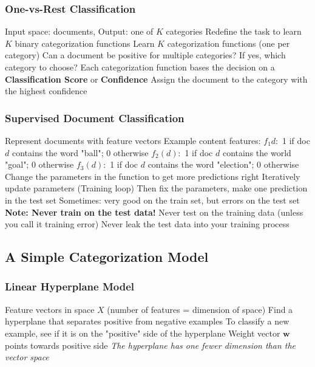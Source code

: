 \documentclass{article}
\renewcommand{\vec}[1]{%
	\mathbf{#1}%
}
\begin{document}
	\subsubsection{One-vs-Rest Classification}
	\begin{outline}
		\1 Input space: documents, Output: one of $K$ categories
		\1 Redefine the task to learn $K$ binary categorization functions
		\1 Learn $K$ categorization functions (one per category)
		\1 Can a document be positive for multiple categories? If yes, which category to choose?
		\2 Each categorization function bases the decision on a \textbf{Classification Score} or \textbf{Confidence}
		\2 Assign the document to the category with the highest confidence
	\end{outline}
	\subsubsection{Supervised Document Classification}
	\begin{outline}
		\1 Represent documents with feature vectors
		\1 Example content features:
			\2 $f_1{d}:$ 1 if doc $d$ contains the word "ball"; 0 otherwise
			\2 $f_2(d):$ 1 if doc $d$ contains the world "goal"; 0 otherwise
			\2 $f_3(d):$ 1 if doc $d$ contains the word "election"; 0 otherwise
		\1 Change the parameters in the function to get more predictions right
		\1 Iteratively update parameters (Training loop)
		\1 Then fix the parameters, make one prediction in the test set
		\1 Sometimes: very good on the train set, but errors on the test set
		\1 {\bf Note: Never train on the test data!}
			\2 Never test on the training data (unless you call it training error)
			\2 Never leak the test data into your training process
	\end{outline}
	\subsection{A Simple Categorization Model}
	\subsubsection{Linear Hyperplane Model}
	\begin{outline}
		\1 Feature vectors in space $X$ (number of features = dimension of space)
		\1 Find a hyperplane that separates positive from negative examples
		\1 To classify a new example, see if it is on the "positive" side of the hyperplane
			\2 Weight vector $\vec{w}$ points towards positive side
		\1 {\it The hyperplane has one fewer dimension than the vector space}
	\end{outline}
\end{document}
